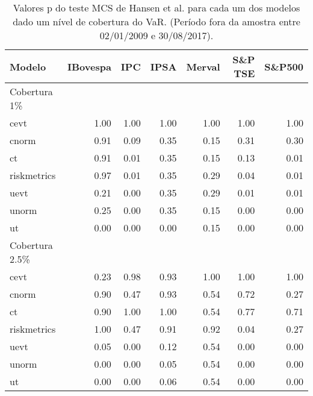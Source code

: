 \begin{table}[H]
\centering
\caption{Valores p do teste MCS de Hansen et al. para cada um dos modelos
             dado um nível de cobertura do VaR. (Período fora da amostra entre 02/01/2009 e 30/08/2017).} 
\label{tab:mcs}
\begin{tabular}{lrrrrrr}
  \hline
Modelo & IBovespa & IPC & IPSA & Merval & S\&P TSE & S\&P500 \\ 
  \hline
Cobertura 1\% &  &  &  &  &  &  \\ 
  cevt & 1.00 & 1.00 & 1.00 & 1.00 & 1.00 & 1.00 \\ 
  cnorm & 0.91 & 0.09 & 0.35 & 0.15 & 0.31 & 0.30 \\ 
  ct & 0.91 & 0.01 & 0.35 & 0.15 & 0.13 & 0.01 \\ 
  riskmetrics & 0.97 & 0.01 & 0.35 & 0.29 & 0.04 & 0.01 \\ 
  uevt & 0.21 & 0.00 & 0.35 & 0.29 & 0.01 & 0.01 \\ 
  unorm & 0.25 & 0.00 & 0.35 & 0.15 & 0.00 & 0.00 \\ 
  ut & 0.00 & 0.00 & 0.00 & 0.15 & 0.00 & 0.00 \\ 
  Cobertura 2.5\% &  &  &  &  &  &  \\ 
  cevt & 0.23 & 0.98 & 0.93 & 1.00 & 1.00 & 1.00 \\ 
  cnorm & 0.90 & 0.47 & 0.93 & 0.54 & 0.72 & 0.27 \\ 
  ct & 0.90 & 1.00 & 1.00 & 0.54 & 0.77 & 0.71 \\ 
  riskmetrics & 1.00 & 0.47 & 0.91 & 0.92 & 0.04 & 0.27 \\ 
  uevt & 0.05 & 0.00 & 0.12 & 0.54 & 0.00 & 0.00 \\ 
  unorm & 0.00 & 0.00 & 0.05 & 0.54 & 0.00 & 0.00 \\ 
  ut & 0.00 & 0.00 & 0.06 & 0.54 & 0.00 & 0.00 \\ 
   \hline
\end{tabular}
\end{table}
